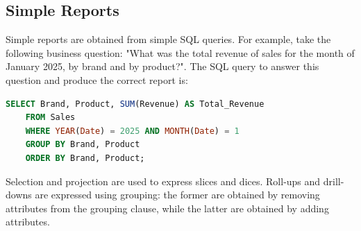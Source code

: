 \subsection{Simple Reports}
Simple reports are obtained from simple SQL queries. For example, take the following business question: "What was the total revenue of sales for the month of January 2025, by brand and by product?". The SQL query to answer this question and produce the correct report is:
\begin{lstlisting}[language=SQL]
    SELECT Brand, Product, SUM(Revenue) AS Total_Revenue
    FROM Sales
    WHERE YEAR(Date) = 2025 AND MONTH(Date) = 1
    GROUP BY Brand, Product
    ORDER BY Brand, Product;
\end{lstlisting}
Selection and projection are used to express slices and dices. Roll-ups and drill-downs are expressed using grouping: the former are obtained by removing attributes from the grouping clause, while the latter are obtained by adding attributes.

